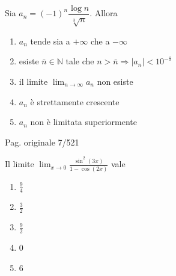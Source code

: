 \begin{quiz}
Sia $a_n=(-1)^n\dfrac{\log n}{\sqrt[3]{n}}$. Allora
\begin{enumerate}[label=\alph*),leftmargin=1.3cm,itemsep=3pt,topsep=5pt]\item $a_n$ tende sia a $+\infty$ che a $-\infty$\item esiste $\bar n\in\mathbb N$ tale che $n>\bar n\Rightarrow|a_n|<10^{-8}$\item il limite $\lim_{n\to\infty}a_n$ non esiste\item $a_n$ \`e strettamente crescente\item $a_n$ non \`e limitata superiormente\end{enumerate}
\end{quiz}

\par\noindent\hfill{\color{cyan!65!black}\scriptsize Pag. originale 7/521}\par\smallskip
\begin{quiz}
Il limite $\displaystyle\lim_{x\to0}\frac{\sin^2(3x)}{1-\cos(2x)}$ vale
\begin{enumerate}[label=\alph*),leftmargin=1.3cm,itemsep=3pt,topsep=5pt]\item $\frac94$\item $\frac32$\item $\frac92$\item $0$\item $6$\end{enumerate}
\end{quiz}

